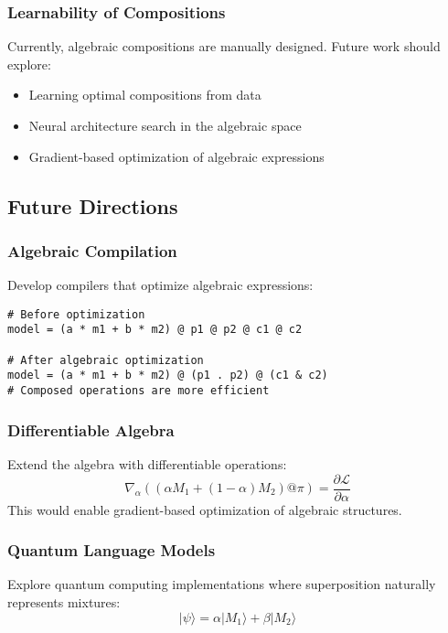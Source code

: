 \documentclass{article}
\theoremstyle{definition}
\begin{document}
\subsubsection{Learnability of Compositions}
Currently, algebraic compositions are manually designed. Future work should explore:
\begin{itemize}
    \item Learning optimal compositions from data
    \item Neural architecture search in the algebraic space
    \item Gradient-based optimization of algebraic expressions
\end{itemize}

\subsection{Future Directions}

\subsubsection{Algebraic Compilation}
Develop compilers that optimize algebraic expressions:
\begin{lstlisting}
# Before optimization
model = (a * m1 + b * m2) @ p1 @ p2 @ c1 @ c2

# After algebraic optimization
model = (a * m1 + b * m2) @ (p1 . p2) @ (c1 & c2)
# Composed operations are more efficient
\end{lstlisting}

\subsubsection{Differentiable Algebra}
Extend the algebra with differentiable operations:
\begin{equation}
\nabla_\alpha ((\alpha M_1 + (1-\alpha) M_2) @ \pi) = \frac{\partial \mathcal{L}}{\partial \alpha}
\end{equation}
This would enable gradient-based optimization of algebraic structures.

\subsubsection{Quantum Language Models}
Explore quantum computing implementations where superposition naturally represents mixtures:
\begin{equation}
|\psi\rangle = \alpha |M_1\rangle + \beta |M_2\rangle
\end{equation}
\end{document}
